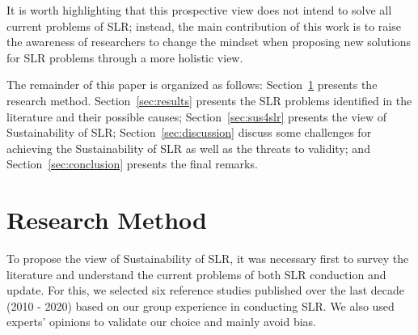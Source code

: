 \documentclass{article}
\begin{document}
It is worth highlighting that this prospective view does not intend to solve all current problems of SLR; instead, the main contribution of this work is to raise the awareness of researchers to change the mindset when proposing new solutions for SLR problems through a more holistic view.


The remainder of this paper is organized as follows: Section~\ref{sec:research_method} presents the research method. Section~\ref{sec:results} presents the SLR problems identified in the literature and their possible causes; Section~\ref{sec:sus4slr} presents the view of Sustainability of SLR; Section~\ref{sec:discussion} discuss some challenges for achieving the Sustainability of SLR as well as the threats to validity; and Section~\ref{sec:conclusion} presents the final remarks.


\section{Research Method} \label{sec:research_method}


To propose the view of Sustainability of SLR, it was necessary first to survey the literature and understand the current problems of both SLR conduction and update. For this, we selected six reference studies published over the last decade (2010 - 2020) \cite{Ampatzoglou2019,Budgen2018Reporting,Zhou2016Threats,Riaz2010,Kitchenham2013,Imtiaz2013} based on our group experience in conducting SLR. We also used experts' opinions to validate our choice and mainly avoid bias. 
\end{document}

